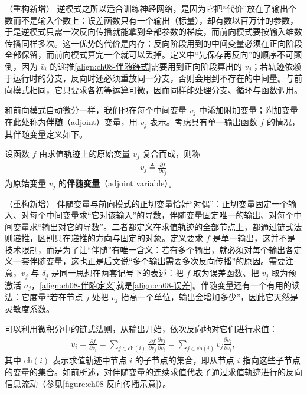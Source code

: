 \documentclass[../../main.tex]{subfiles}
\begin{document}
\begin{remark}（重构新增）
逆模式之所以适合训练神经网络，是因为它把“代价”放在了输出个数而不是输入个数上：误差函数只有一个输出（标量），却有数以百万计的参数，于是逆模式只需一次反向传播就能拿到全部参数的梯度，而前向模式要按输入维数传播同样多次。这一优势的代价是内存：反向阶段用到的中间变量必须在正向阶段全部保留，而前向模式算完一个就可以丢掉。定义中“先保存再反向”的顺序不可颠倒，因为 $\bar{v}_i$ 的递推\eqref{align:ch08-伴随链式}需要用到正向阶段算出的 $v_j$；若轨迹依赖于运行时的分支，反向时还必须重放同一分支，否则会用到不存在的中间量。与前向模式相同，它只要求各初等运算可微，因而同样能处理分支、循环与函数调用。
\end{remark}

和前向模式自动微分一样，我们也在每个中间变量 $v_j$ 中添加附加变量；附加变量在此处称为\textbf{伴随}（adjoint）变量，用 $\bar{v}_j$ 表示。考虑具有单一输出函数 $f$ 的情况，其伴随变量定义如下。

\begin{definition}[伴随变量]\label{definition:ch08-伴随变量}
设函数 $f$ 由求值轨迹上的原始变量 $v_j$ 复合而成，则称
\begin{align}
\bar{v}_j\triangleq\frac{\partial f}{\partial v_j}
\label{align:ch08-伴随定义}
\end{align}
为原始变量 $v_j$ 的\textbf{伴随变量}（adjoint variable）。
\end{definition}

\begin{remark}（重构新增）
伴随变量与前向模式的正切变量恰好“对偶”：正切变量固定一个输入、对每个中间变量求“它对该输入”的导数，伴随变量固定唯一的输出、对每个中间变量求“输出对它的导数”。二者都定义在求值轨迹的全部节点上，都通过链式法则递推，区别只在递推的方向与固定的对象。定义要求 $f$ 是单一输出，这并不是技术限制，而是为了让“伴随”有唯一含义：若有多个输出，就必须对每个输出各定义一套伴随变量，这也正是后文说“多个输出需要多次反向传播”的原因。需要注意，$\bar{v}_j$ 与 $\delta_j$ 是同一思想在两套记号下的表述：把 $f$ 取为误差函数、把 $v_j$ 取为预激活 $a_j$，\eqref{align:ch08-伴随定义}就是\eqref{align:ch08-误差}。伴随变量还有一个有用的读法：它度量“若在节点 $j$ 处把 $v_j$ 抬高一个单位，输出会增加多少”，因此它天然是灵敏度系数。
\end{remark}

可以利用微积分中的链式法则，从输出开始，依次反向地对它们进行求值：
\begin{align}
\bar{v}_i=\frac{\partial f}{\partial v_i}=\sum_{j\in\mathrm{ch}(i)}\frac{\partial f}{\partial v_j}\frac{\partial v_j}{\partial v_i}
=\sum_{j\in\mathrm{ch}(i)}\bar{v}_j\frac{\partial v_j}{\partial v_i},
\label{align:ch08-伴随链式}
\end{align}
其中 $\mathrm{ch}(i)$ 表示求值轨迹中节点 $i$ 的子节点的集合，即从节点 $i$ 指向这些子节点的变量的集合。如前所述，对伴随变量的连续求值代表了通过求值轨迹进行的反向信息流动（参见\cref{figure:ch08-反向传播示意}）。
\end{document}
